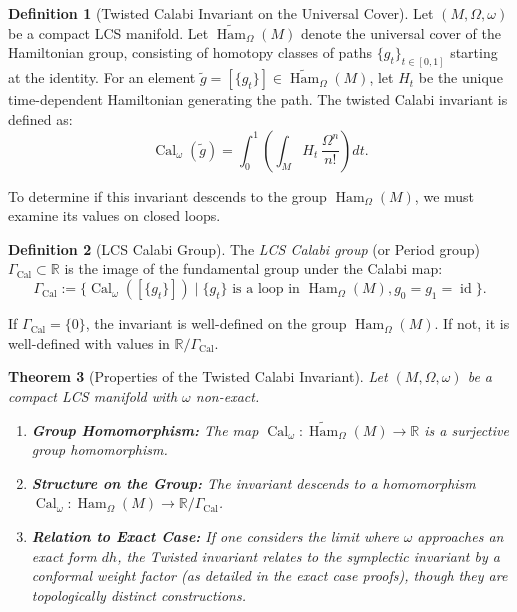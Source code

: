\documentclass[11pt,a4paper]{amsart}
\newtheorem{theorem}{Theorem}[section]
\theoremstyle{definition}
\newtheorem{definition}[theorem]{Definition}
\theoremstyle{remark}
\newcommand{\Ham}{\operatorname{Ham}}
\newcommand{\id}{\operatorname{id}}
\newcommand{\Cal}{\operatorname{Cal}}
\begin{document}
	\begin{definition}[Twisted Calabi Invariant on the Universal Cover] \label{def:twisted_calabi}
		Let $(M, \Omega, \omega)$ be a compact LCS manifold. Let $\widetilde{\Ham}_\Omega(M)$ denote the universal cover of the Hamiltonian group, consisting of homotopy classes of paths $\{g_t\}_{t \in [0,1]}$ starting at the identity. For an element $\tilde{g} = [\{g_t\}] \in \widetilde{\Ham}_\Omega(M)$, let $H_t$ be the unique time-dependent Hamiltonian generating the path. The twisted Calabi invariant is defined as:
		\[
		\Cal_\omega(\tilde{g}) = \int_0^1 \left( \int_M H_t \, \frac{\Omega^n}{n!} \right) dt.
		\]
	\end{definition}
	
	To determine if this invariant descends to the group $\Ham_\Omega(M)$, we must examine its values on closed loops.
	
	\begin{definition}[LCS Calabi Group] \label{def:calabi_group}
		The \emph{LCS Calabi group} (or Period group) $\Gamma_{\Cal} \subset \mathbb{R}$ is the image of the fundamental group under the Calabi map:
		\[
		\Gamma_{\Cal} := \{ \Cal_\omega([\{g_t\}]) \mid \{g_t\} \text{ is a loop in } \Ham_\Omega(M), g_0=g_1=\id \}.
		\]
	\end{definition}
	
	If $\Gamma_{\Cal} = \{0\}$, the invariant is well-defined on the group $\Ham_\Omega(M)$. If not, it is well-defined with values in $\mathbb{R} / \Gamma_{\Cal}$.
	
	\begin{theorem}[Properties of the Twisted Calabi Invariant] \label{thm:twisted_calabi_properties}
		Let $(M, \Omega, \omega)$ be a compact LCS manifold with $\omega$ non-exact.
		\begin{enumerate}
			\item \textbf{Group Homomorphism:} The map $\Cal_\omega : \widetilde{\Ham}_\Omega(M) \to \mathbb{R}$ is a surjective group homomorphism.
			\item \textbf{Structure on the Group:} The invariant descends to a homomorphism $\Cal_\omega : \Ham_\Omega(M) \to \mathbb{R} / \Gamma_{\Cal}$.
			\item \textbf{Relation to Exact Case:} If one considers the limit where $\omega$ approaches an exact form $dh$, the Twisted invariant relates to the symplectic invariant by a conformal weight factor (as detailed in the exact case proofs), though they are topologically distinct constructions.
		\end{enumerate}
	\end{theorem}
	
\end{document}
